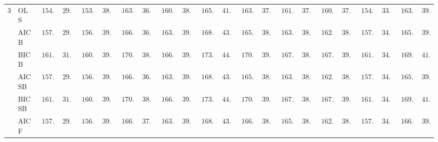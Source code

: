\begin{tabular}{p{0.2cm}p{1cm}|p{0.6cm}p{0.6cm}|p{0.6cm}p{0.6cm}p{0.6cm}p{0.6cm}p{0.6cm}p{0.6cm}|p{0.6cm}p{0.6cm}p{0.6cm}p{0.6cm}p{0.6cm}p{0.6cm}|p{0.6cm}p{0.6cm}p{0.6cm}p{0.6cm}p{0.6cm}p{0.6cm}}
3 & OLS  & $\phantom{0}154.90$ & $\phantom{0}29.43$ & $\phantom{0}153.57$ & $\phantom{0}38.17$ & $\phantom{0}163.70$ & $\phantom{0}36.41$ & $\phantom{0}160.50$ & $\phantom{0}38.41$ & $\phantom{0}165.55$ & $\phantom{0}41.95$ & $\phantom{0}163.30$ & $\phantom{0}37.35$ & $\phantom{0}161.13$ & $\phantom{0}37.67$ & $\phantom{0}160.40$ & $\phantom{0}37.48$ & $\phantom{0}154.51$ & $\phantom{0}33.28$ & $\phantom{0}163.32$ & $\phantom{0}39.35$ \\
 & AIC B  & $\phantom{0}157.39$ & $\phantom{0}29.98$ & $\phantom{0}156.16$ & $\phantom{0}39.17$ & $\phantom{0}166.24$ & $\phantom{0}36.98$ & $\phantom{0}163.32$ & $\phantom{0}39.04$ & $\phantom{0}168.47$ & $\phantom{0}43.01$ & $\phantom{0}165.86$ & $\phantom{0}38.00$ & $\phantom{0}163.76$ & $\phantom{0}38.36$ & $\phantom{0}162.92$ & $\phantom{0}38.28$ & $\phantom{0}157.06$ & $\phantom{0}34.20$ & $\phantom{0}165.84$ & $\phantom{0}39.81$ \\
 & BIC B  & $\phantom{0}161.94$ & $\phantom{0}31.79$ & $\phantom{0}160.18$ & $\phantom{0}39.97$ & $\phantom{0}170.54$ & $\phantom{0}38.29$ & $\phantom{0}166.71$ & $\phantom{0}39.83$ & $\phantom{0}173.71$ & $\phantom{0}44.44$ & $\phantom{0}170.61$ & $\phantom{0}39.77$ & $\phantom{0}167.45$ & $\phantom{0}38.86$ & $\phantom{0}167.90$ & $\phantom{0}39.75$ & $\phantom{0}161.08$ & $\phantom{0}34.69$ & $\phantom{0}169.06$ & $\phantom{0}41.12$ \\
 & AIC SB  & $\phantom{0}157.39$ & $\phantom{0}29.98$ & $\phantom{0}156.16$ & $\phantom{0}39.17$ & $\phantom{0}166.24$ & $\phantom{0}36.98$ & $\phantom{0}163.32$ & $\phantom{0}39.04$ & $\phantom{0}168.47$ & $\phantom{0}43.01$ & $\phantom{0}165.84$ & $\phantom{0}38.00$ & $\phantom{0}163.74$ & $\phantom{0}38.35$ & $\phantom{0}162.92$ & $\phantom{0}38.28$ & $\phantom{0}157.06$ & $\phantom{0}34.20$ & $\phantom{0}165.84$ & $\phantom{0}39.81$ \\
 & BIC SB  & $\phantom{0}161.94$ & $\phantom{0}31.79$ & $\phantom{0}160.18$ & $\phantom{0}39.97$ & $\phantom{0}170.54$ & $\phantom{0}38.29$ & $\phantom{0}166.71$ & $\phantom{0}39.83$ & $\phantom{0}173.71$ & $\phantom{0}44.44$ & $\phantom{0}170.54$ & $\phantom{0}39.68$ & $\phantom{0}167.33$ & $\phantom{0}38.72$ & $\phantom{0}167.86$ & $\phantom{0}39.80$ & $\phantom{0}161.08$ & $\phantom{0}34.69$ & $\phantom{0}169.06$ & $\phantom{0}41.12$ \\
 & AIC F  & $\phantom{0}157.50$ & $\phantom{0}29.94$ & $\phantom{0}156.28$ & $\phantom{0}39.28$ & $\phantom{0}166.61$ & $\phantom{0}37.03$ & $\phantom{0}163.85$ & $\phantom{0}39.37$ & $\phantom{0}168.70$ & $\phantom{0}43.02$ & $\phantom{0}166.58$ & $\phantom{0}38.32$ & $\phantom{0}165.18$ & $\phantom{0}38.51$ & $\phantom{0}162.96$ & $\phantom{0}38.24$ & $\phantom{0}157.47$ & $\phantom{0}34.20$ & $\phantom{0}166.48$ & $\phantom{0}39.89$ \\

\end{tabular}
